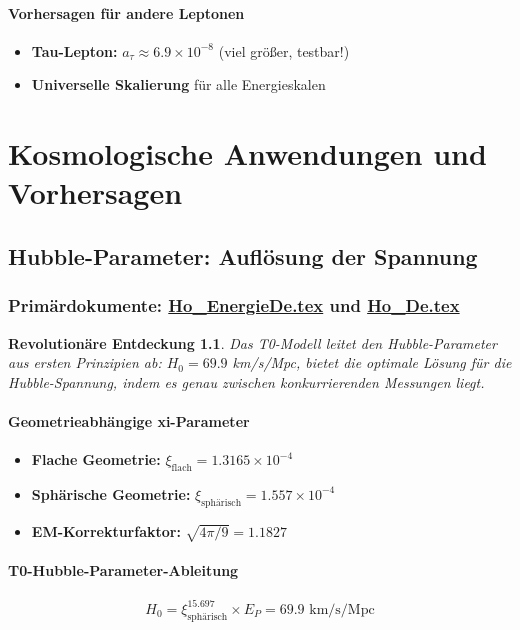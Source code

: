 \documentclass[12pt,a4paper]{report}
\newtheorem{discovery}{Revolutionäre Entdeckung}[chapter]
\begin{document}
	\subsubsection{Vorhersagen für andere Leptonen}
	\begin{itemize}
		\item \textbf{Tau-Lepton:} $a_\tau \approx 6.9 \times 10^{-8}$ (viel größer, testbar!)
		\item \textbf{Universelle Skalierung} für alle Energieskalen
	\end{itemize}
	
	\chapter{Kosmologische Anwendungen und Vorhersagen}
	
	\section{Hubble-Parameter: Auflösung der Spannung}
	\subsection{Primärdokumente: \href{https://github.com/jpascher/T0-Time-Mass-Duality/tree/main/2/pdf/Ho_EnergieDe.pdf}{Ho\_EnergieDe.tex} und \href{https://github.com/jpascher/T0-Time-Mass-Duality/tree/main/2/pdf/Ho_De.pdf}{Ho\_De.tex}}
	
	\begin{discovery}
		Das T0-Modell leitet den Hubble-Parameter aus ersten Prinzipien ab: $H_0 = 69.9$ km/s/Mpc, bietet die optimale Lösung für die Hubble-Spannung, indem es genau zwischen konkurrierenden Messungen liegt.
	\end{discovery}
	
	\subsubsection{Geometrieabhängige xi-Parameter}
	\begin{itemize}
		\item \textbf{Flache Geometrie:} $\xi_{\text{flach}} = 1.3165 \times 10^{-4}$
		\item \textbf{Sphärische Geometrie:} $\xi_{\text{sphärisch}} = 1.557 \times 10^{-4}$
		\item \textbf{EM-Korrekturfaktor:} $\sqrt{4\pi/9} = 1.1827$
	\end{itemize}
	
	\subsubsection{T0-Hubble-Parameter-Ableitung}
	$$H_0 = \xi_{\text{sphärisch}}^{15.697} \times E_P = 69.9 \text{ km/s/Mpc}$$
	
\end{document}
